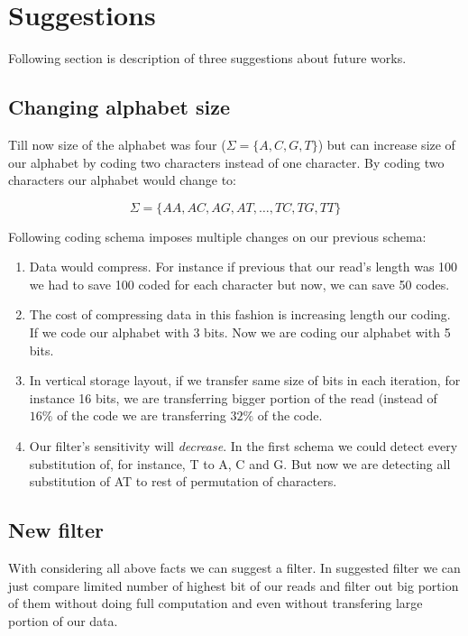 \section{Suggestions}

Following section is description of three suggestions about future works.

\subsection{Changing alphabet size}
Till now size of the alphabet was four ($\Sigma = \{A,C,G,T\}$) but can increase size of our alphabet by coding two characters instead of one character. By coding two characters our alphabet would change to:

\begin{equation}
\nonumber
\Sigma = \{ AA, AC, AG, AT, \dots, TC, TG, TT \}
\end{equation}

Following coding schema imposes multiple changes on our previous schema:

\begin{enumerate}
\item Data would compress. For instance if previous that our read's length was 100 we had to save 100 coded for each character but now, we can save 50 codes.
\item The cost of compressing data in this fashion is increasing length our coding. If we code our alphabet with 3 bits. Now we are coding our alphabet with 5 bits.
\item In vertical storage layout, if we transfer same size of bits in each iteration, for instance 16 bits, we are transferring bigger portion of the read (instead of $16\%$ of the code we are transferring $32\%$ of the code.
\item Our filter's sensitivity will \emph{decrease}. In the first schema we could detect every substitution of, for instance, T to A, C and G. But now we are detecting all substitution of AT to rest of permutation of characters.
\end{enumerate}
 
\subsection{New filter}
With considering all above facts we can suggest a filter. In suggested filter we can just compare limited number of highest bit of our reads and filter out big portion of them without doing full computation and even without transfering large portion of our data.
  